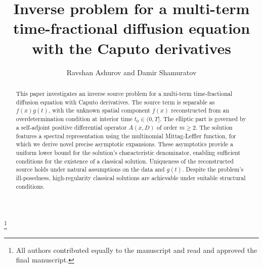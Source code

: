 \documentclass[12pt, reqno]{amsart}
\theoremstyle{definition}
\theoremstyle{remark}
\numberwithin{equation}{section}
\begin{document}
\setcounter{page}{1}

\title[Inverse problem for a multi-term time-fractional diffusion equation \dots ]{Inverse problem for a multi-term time-fractional diffusion equation with the
Caputo derivatives
}

\author[R. Ashurov and  D. Shamuratov]{Ravshan Ashurov and Damir Shamuratov}

\address{\textcolor[rgb]{0.00,0.00,0.84}{Ravshan Ashurov:
V. I. Romanovskiy Institute of Mathematics Uzbekistan Academy of Sciences,
University street 9, Tashkent--100174,
Uzbekistan
}}
\email{\textcolor[rgb]{0.00,0.00,0.84}{ashurovr@gmail.com}}


\address{\textcolor[rgb]{0.00,0.00,0.84}{Damir Shamuratov:
V. I. Romanovskiy Institute of Mathematics Uzbekistan Academy of Sciences,
University street 9, Tashkent--100174,
Uzbekistan}}
\email{\textcolor[rgb]{0.00,0.00,0.84}{damirshamuratov5@gmail.com}}

\thanks{All authors contributed equally to the manuscript and read and approved the final manuscript.}





\begin{abstract} This paper investigates an inverse source problem for a multi-term time-fractional diffusion equation with Caputo derivatives. The source term is separable as \(f(x)g(t)\), with the unknown spatial component \(f(x)\) reconstructed from an overdetermination condition at interior time \(t_0 \in (0, T]\). The elliptic part is governed by a self-adjoint positive differential operator \(A(x, D)\) of order \(m \ge 2\). The solution features a spectral representation using the multinomial Mittag-Leffler function, for which we derive novel precise asymptotic expansions. These asymptotics provide a uniform lower bound for the solution's characteristic denominator, enabling sufficient conditions for the existence of a classical solution. Uniqueness of the reconstructed source holds under natural assumptions on the data and \(g(t)\). Despite the problem's ill-posedness, high-regularity classical solutions are achievable under suitable structural conditions.
\end{abstract} \maketitle
\tableofcontents
\end{document}
